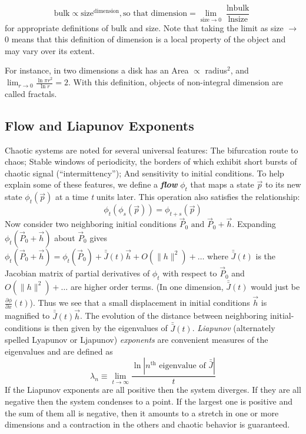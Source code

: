 \documentclass{../lab}
\begin{document}
\[
    \text{bulk} \propto \text{size}^\text{dimension}, \text{so that }  \text{dimension} = \lim_{\text{size} \to 0} \frac{\ln \text{bulk}}{\ln \text{size}}
\]
for appropriate definitions of bulk and size. Note that taking the limit as size $\to$ 0 means that this definition of dimension is a local property of the object and may vary over its extent.

For instance, in two dimensions a disk has an Area $\propto$ radius$^2$, and $\lim_{r \to 0}\frac{\ln\pi r^2}{\ln r} = 2$. With this definition, objects of non-integral dimension are called fractals.

\subsection{Flow and Liapunov Exponents}

Chaotic systems are noted for several universal features: The bifurcation route to chaos; Stable windows of periodicity, the borders of which exhibit short bursts of chaotic signal (``intermittency''); And sensitivity to initial conditions. To help explain some of these features, we define a \emph{\textbf{flow}} $ \phi_t $ that maps a state $ \vec p $ to its new state $ {\phi}_t(\vec p) $ at a time \emph{t} units later. This operation also satisfies the relationship:
\[
    \phi_t(\phi_s(\vec p)) = \phi_{t+s}(\vec p)
\]
Now consider two neighboring initial conditions $\vec P_0 \text{ and } \vec P_0+\vec h$. Expanding $\phi_t(\vec P_0+\vec h)$ about $\vec P_0$ gives $\phi_t(\vec P_0+\vec h) = \phi_t(\vec P_0) + \bar{\bar J}(t)\vec h + O(\| h\|^2) + \ldots$ where $\bar{\bar J}(t)$ is the Jacobian matrix of partial derivatives of $\phi_t$ with respect to $\vec P_0$ and $O(\| h\|^2) + \ldots$ are higher order terms. (In one dimension, $\bar{\bar J}(t)$ would just be $ \frac{\partial\phi}{\partial x}(t) $). Thus we see that a small displacement in initial conditions $ \vec h $ is magnified to $ \bar{\bar J}(t)\vec h $. The evolution of the distance between neighboring initial-conditions is then given by the eigenvalues of $ \bar{\bar J}(t) $. \emph{Liapunov} (alternately spelled Lyapunov or Ljapunov) \emph{exponents} are convenient measures of the eigenvalues and are defined as
\begin{equation}
    \lambda_n \equiv \lim_{t \to \infty}\frac{\ln| n^\text{th} \text{ eigenvalue of } \bar{\bar J}| }{t}
\end{equation}
If the Liapunov exponents are all positive then the system diverges. If they are all negative then the system condenses to a point. If the largest one is positive and the sum of them all is negative, then it amounts to a stretch in one or more dimensions and a contraction in the others and chaotic behavior is guaranteed.
\end{document}
